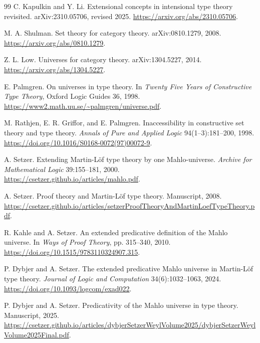 \documentclass[11pt]{article}
\theoremstyle{definition}
\theoremstyle{remark}
\begin{document}
\begin{thebibliography}{99}
C. Kapulkin and Y. Li.
\newblock Extensional concepts in intensional type theory revisited.
\newblock arXiv:2310.05706, revised 2025.
\newblock \url{https://arxiv.org/abs/2310.05706}.

M. A. Shulman.
\newblock Set theory for category theory.
\newblock arXiv:0810.1279, 2008.
\newblock \url{https://arxiv.org/abs/0810.1279}.

Z. L. Low.
\newblock Universes for category theory.
\newblock arXiv:1304.5227, 2014.
\newblock \url{https://arxiv.org/abs/1304.5227}.

E. Palmgren.
\newblock On universes in type theory.
\newblock In \emph{Twenty Five Years of Constructive Type Theory},
  Oxford Logic Guides 36, 1998.
\newblock \url{https://www2.math.uu.se/~palmgren/universe.pdf}.

M. Rathjen, E. R. Griffor, and E. Palmgren.
\newblock Inaccessibility in constructive set theory and type theory.
\newblock \emph{Annals of Pure and Applied Logic} 94(1--3):181--200, 1998.
\newblock \url{https://doi.org/10.1016/S0168-0072(97)00072-9}.

A. Setzer.
\newblock Extending Martin-L\"of type theory by one Mahlo-universe.
\newblock \emph{Archive for Mathematical Logic} 39:155--181, 2000.
\newblock \url{https://csetzer.github.io/articles/mahlo.pdf}.

A. Setzer.
\newblock Proof theory and Martin-L\"of type theory.
\newblock Manuscript, 2008.
\newblock \url{https://csetzer.github.io/articles/setzerProofTheoryAndMartinLoefTypeTheory.pdf}.

R. Kahle and A. Setzer.
\newblock An extended predicative definition of the Mahlo universe.
\newblock In \emph{Ways of Proof Theory}, pp. 315--340, 2010.
\newblock \url{https://doi.org/10.1515/9783110324907.315}.

P. Dybjer and A. Setzer.
\newblock The extended predicative Mahlo universe in Martin-L\"of type theory.
\newblock \emph{Journal of Logic and Computation} 34(6):1032--1063, 2024.
\newblock \url{https://doi.org/10.1093/logcom/exad022}.

P. Dybjer and A. Setzer.
\newblock Predicativity of the Mahlo universe in type theory.
\newblock Manuscript, 2025.
\newblock \url{https://csetzer.github.io/articles/dybjerSetzerWeylVolume2025/dybjerSetzerWeylVolume2025Final.pdf}.


\end{thebibliography}
\end{document}
